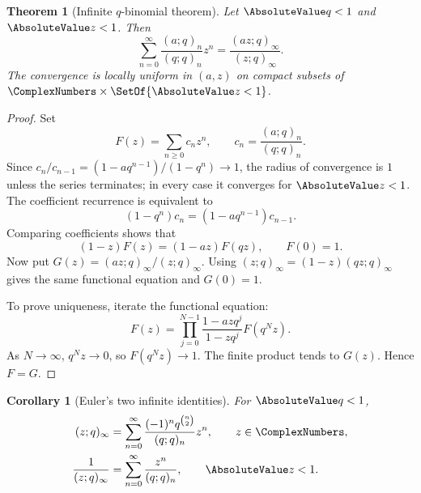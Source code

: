 \documentclass[11pt,a4paper,oneside,openany]{book}
\newtheorem{theorem}{Theorem}[chapter]
\newtheorem{corollary}[corollary]{Corollary}
\theoremstyle{definition}
\theoremstyle{remark}
\begin{document}
\begin{theorem}[Infinite $q$-binomial theorem]\label{thm:infinite-qbinomial}
Let $\AbsoluteValue q<1$ and $\AbsoluteValue z<1$.  Then
\[
 \sum_{n=0}^{\infty}\frac{(a;q)_n}{(q;q)_n}z^n
 =\frac{(az;q)_\infty}{(z;q)_\infty}.
\]
The convergence is locally uniform in $(a,z)$ on compact subsets of $\ComplexNumbers\times\SetOf{\AbsoluteValue z<1}$.
\end{theorem}

\begin{proof}
Set
\[
 F(z)=\sum_{n\ge0}c_nz^n,
 \qquad c_n=\frac{(a;q)_n}{(q;q)_n}.
\]
Since $c_{n}/c_{n-1}=(1-aq^{n-1})/(1-q^n)\to1$, the radius of convergence is $1$ unless the series terminates; in every case it converges for $\AbsoluteValue z<1$.  The coefficient recurrence is equivalent to
\[
 (1-q^n)c_n=(1-aq^{n-1})c_{n-1}.
\]
Comparing coefficients shows that
\[
 (1-z)F(z)=(1-az)F(qz),\qquad F(0)=1.\label{eq:qbinom-fe}
\]
Now put
\(
 G(z)=(az;q)_\infty/(z;q)_\infty.
\)
Using $(z;q)_\infty=(1-z)(qz;q)_\infty$ gives the same functional equation and $G(0)=1$.

To prove uniqueness, iterate the functional equation:
\[
 F(z)=\prod_{j=0}^{N-1}\frac{1-azq^j}{1-zq^j}F(q^Nz).
\]
As $N\to\infty$, $q^Nz\to0$, so $F(q^Nz)\to1$.  The finite product tends to $G(z)$.  Hence $F=G$.
\end{proof}

\begin{corollary}[Euler's two infinite identities]\label{cor:euler-infinite}
For $\AbsoluteValue q<1$,
\begin{align}
 (z;q)_\infty
 &=\sum_{n=0}^{\infty}\frac{(-1)^nq^{\binom n2}}{(q;q)_n}z^n,
 \qquad z\in\ComplexNumbers,\label{eq:euler-product-series}\\
 \frac1{(z;q)_\infty}
 &=\sum_{n=0}^{\infty}\frac{z^n}{(q;q)_n},
 \qquad \AbsoluteValue z<1.\label{eq:euler-reciprocal-series}
\end{align}
\end{corollary}
\end{document}
